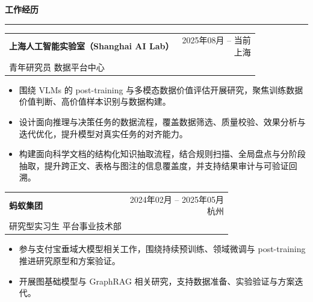 \documentclass[UTF8]{ctexart}
\makeatletter
\newcommand{\cvsection}[1]{%
  \vspace{0.35em}
  {\zihao{-3}\bfseries #1\par}
  \vspace{0.1em}
  {\color{cvrule}\hrule height 0.8pt}
  \vspace{0.36em}
}
\newcommand{\cventryloc}[4]{%
  \begin{tabularx}{\textwidth}{@{}Xr@{}}
    \textbf{#1} & \shortstack[r]{#2\\#3} \\
    #4 &
  \end{tabularx}\par
}
\makeatother
\begin{document}
\cvsection{工作经历}
\cventryloc{上海人工智能实验室（Shanghai AI Lab）}{2025年08月 -- 当前}{上海}{青年研究员 \quad 数据平台中心}
\begin{itemize}
  \item 围绕 VLMs 的 post-training 与多模态数据价值评估开展研究，聚焦训练数据价值判断、高价值样本识别与数据构建。
  \item 设计面向推理与决策任务的数据流程，覆盖数据筛选、质量校验、效果分析与迭代优化，提升模型对真实任务的对齐能力。
  \item 构建面向科学文档的结构化知识抽取流程，结合规则扫描、全局盘点与分阶段抽取，提升跨正文、表格与图注的信息覆盖度，并支持结果审计与可验证回溯。
\end{itemize}
\vspace{-0.2em}
\cventryloc{蚂蚁集团}{2024年02月 -- 2025年05月}{杭州}{研究型实习生 \quad 平台事业技术部}
\begin{itemize}
  \item 参与支付宝垂域大模型相关工作，围绕持续预训练、领域微调与 post-training 推进研究原型和方案验证。
  \item 开展图基础模型与 GraphRAG 相关研究，支持数据准备、实验验证与方案迭代。
\end{itemize}
\end{document}
